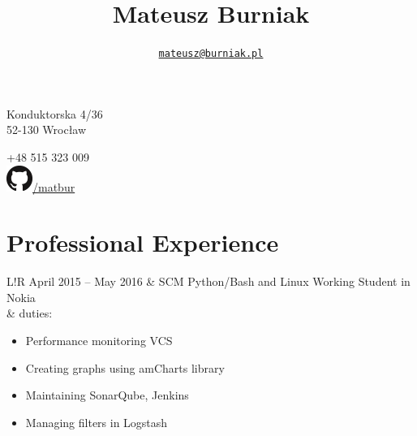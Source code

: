 \documentclass{article}
\title{\bf\Huge Mateusz Burniak}
\author{\href{mailto:mateusz@burniak.pl}{\nolinkurl{mateusz@burniak.pl}}}
\date{}
\newcommand\VRule{\color{lightgray}\vrule width 0.5pt}
\begin{document}
\maketitle
\thispagestyle{fancy}

\begin{minipage}[ht]{.5\textwidth}
\centering
Konduktorska 4/36 \\
52-130 Wrocław
\end{minipage}
\begin{minipage}[ht]{.5\textwidth}
\centering
+48 515 323 009\\
\href{https://github.com/matbur}{\includegraphics[scale=.3]{github.png}/matbur}\\
\end{minipage}

\vspace{1em}

\section*{Professional Experience}
\begin{tabular}{L!{\VRule}R}
April 2015 -- May 2016 & SCM Python/Bash and Linux Working Student in Nokia \\
& duties:
\begin{itemize}
\item Performance monitoring VCS
\item Creating graphs using amCharts library
\item Maintaining SonarQube, Jenkins
\item Managing filters in Logstash
\end{itemize}
\end{tabular}
\end{document}
